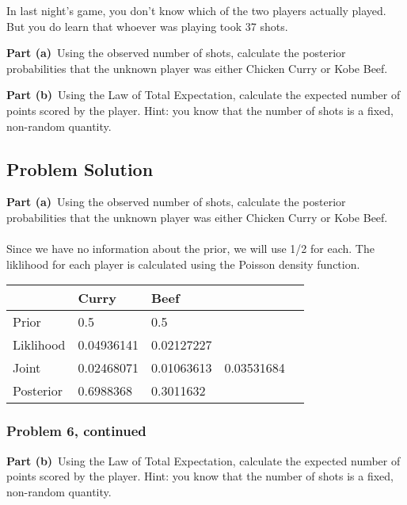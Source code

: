 \documentclass[12pt]{article}
\theoremstyle{definition}
\begin{document}
\bigskip
In last night's game, you don't know which of the two players actually played. But you do learn that whoever was playing took 37 shots. 

\bigskip
\noindent
{\bf Part (a)}\ Using the observed number of shots, calculate the posterior probabilities that the unknown player was either Chicken Curry or Kobe Beef.

\bigskip
\noindent
{\bf Part (b)}\ Using the Law of Total Expectation, calculate the expected number of points scored by the player. Hint: you know that the number of shots is a fixed, non-random quantity.

\newpage
\subsection*{Problem Solution}

\noindent
{\bf Part (a)}\ Using the observed number of shots, calculate the posterior probabilities that the unknown player was either Chicken Curry or Kobe Beef.\\\\

Since we have no information about the prior, we will use 1/2 for each. The liklihood for each player is calculated using the Poisson density function.\\
\begin{tabular}{lllll}
&   Curry   &   Beef   \\
\hline
Prior      &   0.5   &   0.5   &\\
Liklihood  &   0.04936141   &   0.02127227   &\\
Joint      &   0.02468071   &   0.01063613   &   0.03531684\\
Posterior  &   0.6988368   &   0.3011632   &\\
\hline
\end{tabular}

\newpage
\subsubsection*{Problem 6, continued}

\noindent
{\bf Part (b)}\ Using the Law of Total Expectation, calculate the expected number of points scored by the player. Hint: you know that the number of shots is a fixed, non-random quantity.\\\\
\end{document}

